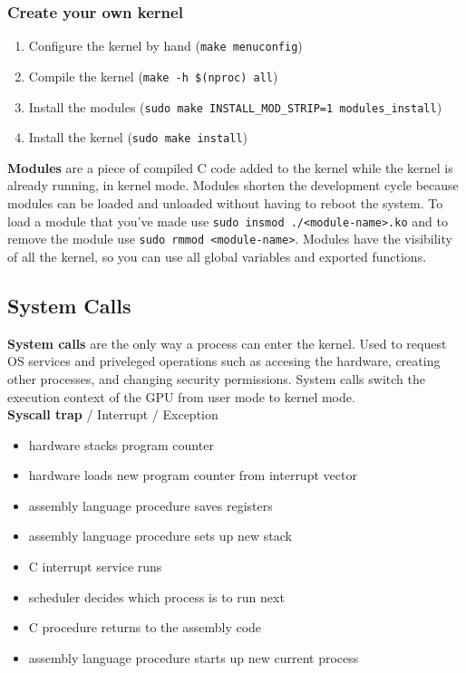 \documentclass{article}
\begin{document}
    \subsubsection{Create your own kernel}

    \begin{enumerate}
    \item Configure the kernel by hand (\texttt{make menuconfig})
    \item Compile the kernel (\texttt{make -h \$(nproc) all})
    \item Install the modules (\texttt{sudo make INSTALL\_MOD\_STRIP=1 modules\_install})
    \item Install the kernel (\texttt{sudo make install})
    \end{enumerate}
    
    \noindent \textbf{Modules} are a piece of compiled C code added to the kernel while the kernel is already running, in kernel mode. Modules shorten the development cycle because modules can be loaded and unloaded without having to reboot the system. To load a module that you've made use \texttt{sudo insmod ./<module-name>.ko} and to remove the module use \texttt{sudo rmmod <module-name>}. Modules have the visibility of all the kernel, so you can use all global variables and exported functions. 

\subsection{System Calls}

    \textbf{System calls} are the only way a process can enter the kernel. Used to request OS services and priveleged operations such as accesing the hardware, creating other processes, and changing security permissions. System calls switch the execution context of the GPU from user mode to kernel mode. \\

    \noindent \textbf{Syscall trap} / Interrupt / Exception

    \begin{itemize}
    \item hardware stacks program counter
    \item hardware loads new program counter from interrupt vector
    \item assembly language procedure saves registers
    \item assembly language procedure sets up new stack
    \item C interrupt service runs
    \item scheduler decides which process is to run next
    \item C procedure returns to the assembly code
    \item assembly language procedure starts up new current process
    \end{itemize}
\end{document}
